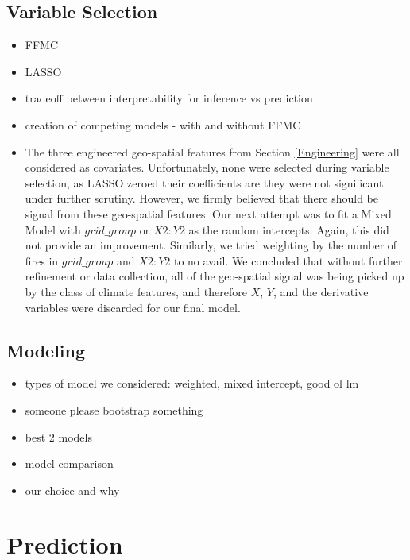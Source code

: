 \documentclass{article}
\begin{document}
\subsection{Variable Selection}

\begin{itemize}

\item FFMC
\item LASSO
\item tradeoff between interpretability for inference vs prediction
\item creation of competing models - with and without FFMC
\item The three engineered geo-spatial features from Section \ref{Engineering} were all considered as covariates. Unfortunately, none were selected during variable selection, as LASSO zeroed their coefficients are they were not significant under further scrutiny. However, we firmly believed that there should be signal from these geo-spatial features. Our next attempt was to fit a Mixed Model with $\textit{grid\_group}$ or $X2:Y2$ as the random intercepts. Again, this did not provide an improvement. Similarly, we tried weighting by the number of fires in $\textit{grid\_group}$ and $X2:Y2$ to no avail. We concluded that without further refinement or data collection, all of the geo-spatial signal was being picked up by the class of climate features, and therefore $X$, $Y$, and the derivative variables were discarded for our final model.

\end{itemize}

\subsection{Modeling}

\begin{itemize}

\item types of model we considered: weighted, mixed intercept, good ol lm
\item someone please bootstrap something
\item best 2 models
\item model comparison
\item our choice and why

\end{itemize}

\section{Prediction}\label{Prediction}
\end{document}
